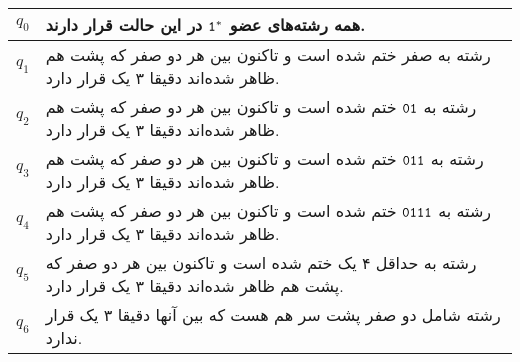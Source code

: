 \documentclass{article}
\begin{document}
\begin{enumerate}
\begin{center}
\end{center}
	
	\begin{center}
			\begin{tabularx}{\linewidth}{|c|X|}
			\hline
			$q_0$ &		
			همه رشته‌های عضو 
			$\tt 1^*$
			در این حالت قرار دارند.
			\\ \hline
			$q_1$ &								
	رشته به صفر ختم شده است و تاکنون بین هر دو صفر که پشت هم ظاهر شده‌اند دقیقا ۳ یک قرار دارد.
			\\ \hline
			$q_2$ &						
			رشته به 
			$\tt 01 $ 
			ختم شده است و تاکنون بین هر دو صفر که پشت هم ظاهر شده‌اند دقیقا ۳ یک قرار دارد.
			\\ \hline
			$q_3$ &				
			رشته به 
			$\tt 011 $
			 ختم شده است و تاکنون بین هر دو صفر که پشت هم ظاهر شده‌اند دقیقا ۳ یک قرار دارد.
			\\ \hline
			$q_4$ &				
		رشته به 
		$ \tt 0111 $ 
		ختم شده است و تاکنون بین هر دو صفر که پشت هم ظاهر شده‌اند دقیقا ۳ یک قرار دارد.
			\\ \hline
			$q_5$ &
			رشته به حداقل ۴ یک ختم شده است و تاکنون بین هر دو صفر که پشت هم ظاهر شده‌اند دقیقا ۳ یک قرار دارد.
			\\ \hline
			$q_6$ &
			رشته شامل دو صفر پشت سر هم هست که بین آنها دقیقا ۳ یک قرار ندارد.
			\\ \hline
		\end{tabularx}
	\end{center}
	

\end{enumerate}
\end{document}
